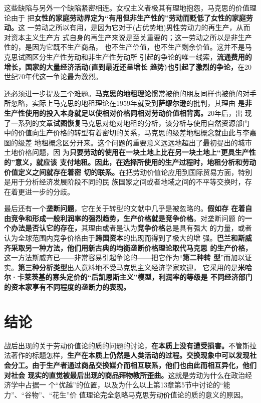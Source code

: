 这些缺陷与另外一个缺陷紧密相连。女权主义者极其有理地抱怨，马克思的价值理论由于
把\textbf{女性的家庭劳动界定为“有用但非生产性的”劳动而贬低了女性的家庭劳动。}这
一劳动之所以有用，是因为它对于(占优势地)男性劳动力的再生产，从而对资本主义生产方
式自身的再生产来说是至关重要的；这一劳动之所以是非生产性的，是因为它既不生产商品，
也不生产价值，也不生产剩余价值。这并不是马克思试图区分生产性劳动和非生产性劳动所
引起的争论的唯一线索，\textbf{流通费用的增长，国家的大量经济活动(直到最近还呈增长
  趋势)也引起了激烈的争论，}在20世纪70年代这一争论最为激烈。

还必须进一步提及三个难题。\textbf{马克思的地租理论}惯常被他的朋友同样也被他的对手
所忽略，实际上马克思的地租理论在1959年就受到\textbf{萨缪尔逊}的批判，其理由
是\textbf{非生产性使用的投入本身就足以使相对价格同相对劳动价值相背离。}20年后，出
现了一系列的文章\textbf{试图恢复}马克思对绝对地租的分析，该分析与使用自然资源部门
中的价值向生产价格的转型有着密切的关系，马克思的级差地租概念就由此与李嘉图的级差
地租概念区分开来。这个问题的重要意义远远地超出了最初提出的城市土地价格问题，因
为\textbf{只要劳动的使用在一块土地上比在另一块土地上“更具生产性的”意义，就应该
  支付地租。因此，在选择所使用的生产过程时，地租分析和劳动价值定义之间就存在着密
  切的联系。}在把劳动价值论应用到国际贸易方面，特别是用于分析经济发展阶段不同的民
族国家之间或者地域之间的不平等交换时，存在着更进一步的分歧。

最后还有一个\textbf{垄断问题}，它在关于转型的文献中几乎是被忽略的。\textbf{假如存
  在着自由竞争和形成一般利润率的强烈趋势，生产价格就是竞争价格}。对垄断问题
的\textbf{一个办法是否认它的存在，}其理由或者是认为\textbf{竞争价格}总是具有强大
的力量，或者认为全球范围内竞争价格由于\textbf{跨国资本}的出现而得到了极大的增
强。\textbf{巴兰和斯威齐采取另一种方法，他们用新古典的均衡垄断价格理论取代马克思
  的生产价格，}这一方法斯威齐已——非常容易引起争论的——把它作为“\textbf{第二种转
  型}”而加以证实。\textbf{第三种分析类型}出人意料地不受马克思主义经济学家欢迎，
它采用的是\textbf{米哈尔·卡莱茨基的寡头定价的“后凯恩斯主义”模型，利润率的等级是
  不同经济部门的资本家享有不同程度的垄断力的表现。}

\section{结论}

战后出现的关于劳动价值论的质的问题的讨论，\textbf{在本质上没有遭受损害。}不管斯拉
法著作的标题怎样，\textbf{生产在本质上仍然是人类活动的过程。交换现象中可以发现社
  会分工。由于生产者通过商品交换媒介而相互联系，他们也由此而相互异化，他们对社会
  现实的直觉被最后出现的商品拜物教所歪曲。}这就是劳动为什么在政治经济学中占据一
个“优越”的位置，以及为什么以上第13章第5节中讨论的“能力”、“谷物”、“花生”价
值理论完全忽略马克思劳动价值论的质的意义的原因。

